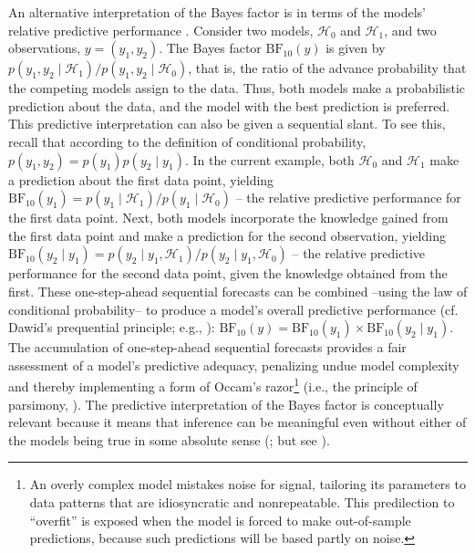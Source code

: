 An alternative interpretation of the Bayes factor is in terms of the models' relative predictive performance \cite{WagenmakersEtAl2006,WagenmakersEtAl2016CD}. Consider two models, $\mathcal{H}_0$ and $\mathcal{H}_1$, and two observations, $y = (y_1,y_2)$. The Bayes factor $\text{BF}_{10}(y)$ is given by $p(y_1,y_2 \mid \mathcal{H}_1) / p(y_1,y_2 \mid \mathcal{H}_0)$, that is, the ratio of the advance probability that the competing models assign to the data. Thus, both models make a probabilistic prediction about the data, and the model with the best prediction is preferred. This predictive interpretation can also be given a sequential slant. To see this, recall that according to the definition of conditional probability, $p(y_1,y_2) = p(y_1) p(y_2 \mid y_1)$. In the current example, both $\mathcal{H}_0$ and $\mathcal{H}_1$ make a prediction about the first data point, yielding $\text{BF}_{10}(y_1) = p(y_1 \mid \mathcal{H}_1) / p(y_1 \mid \mathcal{H}_0)$ -- the relative predictive performance for the first data point. Next, both models incorporate the knowledge gained from the first data point and make a prediction for the second observation, yielding $\text{BF}_{10}(y_2 \mid y_1) = p(y_2 \mid y_1, \mathcal{H}_1) / p(y_2 \mid y_1, \mathcal{H}_0)$ -- the relative predictive performance for the second data point, given the knowledge obtained from the first. These one-step-ahead sequential forecasts can be combined --using the law of conditional probability-- to produce a model's overall predictive performance (cf. Dawid's prequential principle; e.g., ): $\text{BF}_{10}(y) = \text{BF}_{10}(y_1) \times \text{BF}_{10}(y_2 \mid y_1)$. The accumulation of one-step-ahead sequential forecasts provides a fair assessment of a model's predictive adequacy, penalizing undue model complexity and thereby implementing a form of Occam's razor\footnote{An overly complex model mistakes noise for signal, tailoring its parameters to data patterns that are idiosyncratic and nonrepeatable. This predilection to ``overfit'' is exposed when the model is forced to make out-of-sample predictions, because such predictions will be based partly on noise.} (i.e., the principle of parsimony, ). The predictive interpretation of the Bayes factor is conceptually relevant because it means that inference can be meaningful even without either of the models being true in some absolute sense (; but see ).


